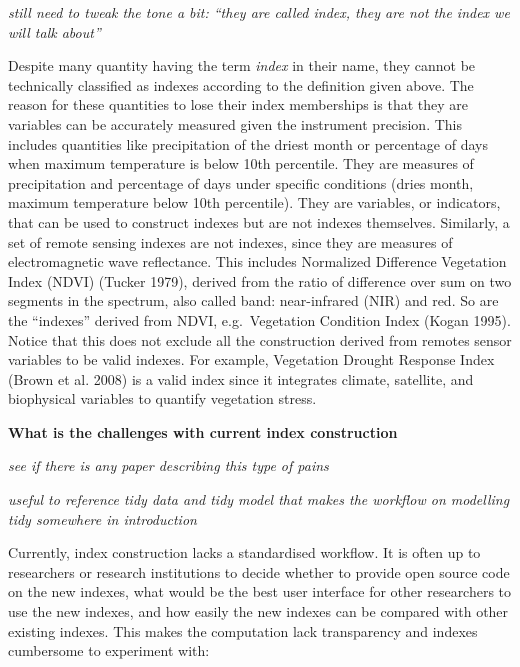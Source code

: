 \documentclass[
]{article}
\begin{document}
\emph{still need to tweak the tone a bit: ``they are called index, they
are not the index we will talk about''}

Despite many quantity having the term \emph{index} in their name, they
cannot be technically classified as indexes according to the definition
given above. The reason for these quantities to lose their index
memberships is that they are variables can be accurately measured given
the instrument precision. This includes quantities like precipitation of
the driest month or percentage of days when maximum temperature is below
10th percentile. They are measures of precipitation and percentage of
days under specific conditions (dries month, maximum temperature below
10th percentile). They are variables, or indicators, that can be used to
construct indexes but are not indexes themselves. Similarly, a set of
remote sensing indexes are not indexes, since they are measures of
electromagnetic wave reflectance. This includes Normalized Difference
Vegetation Index (NDVI) (Tucker 1979), derived from the ratio of
difference over sum on two segments in the spectrum, also called band:
near-infrared (NIR) and red. So are the ``indexes'' derived from NDVI,
e.g.~Vegetation Condition Index (Kogan 1995). Notice that this does not
exclude all the construction derived from remotes sensor variables to be
valid indexes. For example, Vegetation Drought Response Index (Brown et
al. 2008) is a valid index since it integrates climate, satellite, and
biophysical variables to quantify vegetation stress.

\textbf{What is the challenges with current index construction}

\emph{see if there is any paper describing this type of pains}

\emph{useful to reference tidy data and tidy model that makes the
workflow on modelling tidy somewhere in introduction}

Currently, index construction lacks a standardised workflow. It is often
up to researchers or research institutions to decide whether to provide
open source code on the new indexes, what would be the best user
interface for other researchers to use the new indexes, and how easily
the new indexes can be compared with other existing indexes. This makes
the computation lack transparency and indexes cumbersome to experiment
with:
\end{document}
